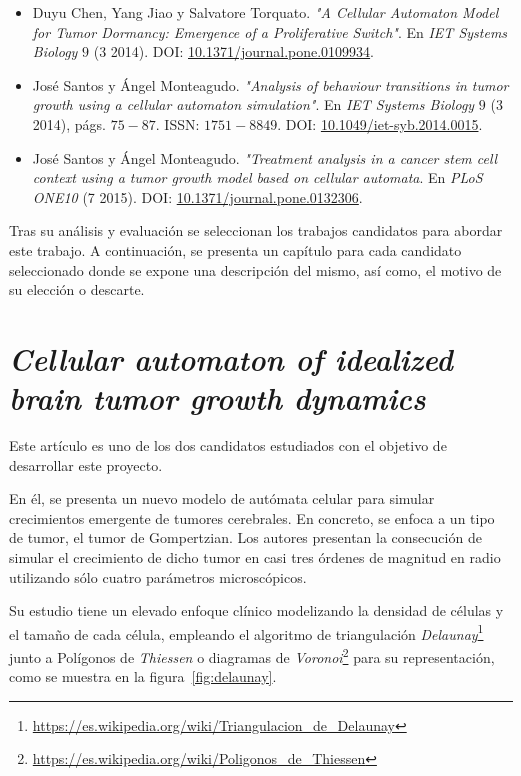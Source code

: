 \begin{itemize}
    \item Duyu Chen, Yang Jiao y Salvatore Torquato.
    \textit{"}\textit{A Cellular Automaton Model for Tumor Dormancy: Emergence of a Proliferative Switch"}.
    En \textit{IET Systems Biology} $9$ (3 2014). DOI: \url{10.1371/journal.pone.0109934}.
    \item José Santos y Ángel Monteagudo.
    \textit{"}\textit{Analysis of behaviour transitions in tumor growth using a cellular automaton simulation"}.
    En \textit{IET Systems Biology} $9$ (3 2014), págs. $75 - 87$. ISSN:
    $1751-8849$. DOI: \url{10.1049/iet-syb.2014.0015}.
    \item José Santos y Ángel Monteagudo.
    \textit{"}\textit{Treatment analysis in a cancer stem cell context using a tumor growth model based on cellular automata}.
    En \textit{PLoS ONE10} (7 2015). DOI: \url{10.1371/journal.pone.0132306}.
\end{itemize}

Tras su análisis y evaluación se seleccionan los trabajos candidatos para abordar
este trabajo. A continuación, se presenta un capítulo para cada candidato seleccionado donde se
expone una descripción del mismo, así como, el motivo de su elección o descarte.

\section{\textit{Cellular automaton of idealized brain tumor growth dynamics}}

Este artículo \cite{kansal-torquato} es uno de los dos candidatos estudiados con el objetivo
de desarrollar este proyecto.

En él, se presenta un nuevo modelo de autómata celular para simular crecimientos emergente de tumores cerebrales.
En concreto, se enfoca a un tipo de tumor, el tumor de Gompertzian. Los autores presentan
la consecución de simular el crecimiento de dicho tumor en casi tres órdenes de magnitud en radio
utilizando sólo cuatro parámetros microscópicos.

Su estudio tiene un elevado enfoque clínico modelizando la densidad de células y
el tamaño de cada célula, empleando el algoritmo de triangulación \textit{Delaunay}\footnote{\url{https://es.wikipedia.org/wiki/Triangulacion_de_Delaunay}}
junto a Polígonos de \textit{Thiessen} o diagramas de \textit{Voronoi}\footnote{\url{https://es.wikipedia.org/wiki/Poligonos_de_Thiessen}} para su representación,
como se muestra en la figura~\ref{fig:delaunay}.

